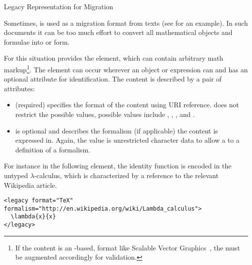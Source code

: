 \begin{omgroup}[id=mobj,short=Mathematical Objects]
\begin{module}[id=legacy]
\begin{omgroup}[id=legacy]{Legacy Representation for Migration}

  Sometimes, {\omdoc} is used as a migration format from {} texts (see
  {} for an example). In such documents it can be too much effort
  to convert all mathematical objects and formulae into {\openmath} or {\cmathml} form.

\begin{definition}[id=legacy.def]
  For this situation {\omdoc} provides the {} element, which can contain
  arbitrary math markup\footnote{If the content is an {\xml}-based, format like Scalable
    Vector Graphics~\cite{W3C:svg02}, the {} must be augmented accordingly
    for validation.}. The {} element can occur wherever an {\openmath}
  object or {\cmathml} expression can and has an optional
  {} attribute for identification. The content is
  described by a pair of attributes:
  \begin{itemize}
  \item {} (required) specifies the format of the content using
    URI reference. {\omdoc} does not restrict the possible values, possible values include
    {}, {},
    {}, and {}.
  \item {} is optional and describes the formalism (if
    applicable) the content is expressed in. Again, the value is unrestricted character
    data to allow a {} to a definition of a formalism.
  \end{itemize}
\end{definition}

For instance in the following {} element, the identity function is encoded
in the untyped $\lambda$-calculus, which is characterized by a reference to the relevant
Wikipedia article.

\begin{lstlisting}[index={legacy}]
<legacy format="TeX" formalism="http://en.wikipedia.org/wiki/Lambda_calculus">
  \lambda{x}{x}
</legacy>
\end{lstlisting}
\end{omgroup}
\end{module}
\end{omgroup}

